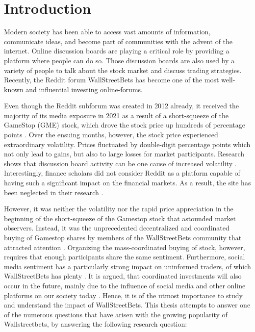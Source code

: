 \documentclass[11pt, a4paper]{article}
\begin{document}
\section{Introduction} \label{introduction}

Modern society has been able to access vast amounts of information, communicate ideas, and become part of communities with the advent of the internet. 
Online discussion boards are playing a critical role by providing a platform where people can do so. Those discussion boards are also used by a 
variety of people to talk about the stock market and discuss trading strategies. Recently, the Reddit forum WallStreetBets has become one of 
the most well-known and influential investing online-forums.

Even though the Reddit subforum was created in 2012 already, it received the majority of its media exposure in 2021 as a result of a short-squeeze 
of the GameStop (GME) stock, which drove the stock price up hundreds of percentage points \citep{diangson2021betonreddit}. Over the ensuing months, however, 
the stock price experienced extraordinary volatility. Prices fluctuated by double-digit percentage points which not only lead to gains, but also to large losses
for market participants. Research shows that discussion board activity can be one cause of increased volatility \citep{das2007yahoo}.
Interestingly, finance scholars did not consider Reddit as a platform capable of having such a significant impact on the financial markets. 
As a result, the site has been neglected in their research \citep{long2021LikeTheStock}.

However, it was neither the volatility nor the rapid price appreciation in the beginning of the short-squeeze of the Gamestop stock that astounded market observers. 
Instead, it was the unprecedented decentralized and coordinated buying of Gamestop shares by members of the WallStreetBets 
community that attracted attention \citep{anand2021WallstreetbetsAgainstWallstreet}.
Organizing the mass-coordinated buying of stock, however, requires that enough participants share the same sentiment. Furthermore, 
social media sentiment has a particularly strong impact on uninformed traders, of which WallStreetBets has plenty \citep{danbolt2015InvestorSentiment}. It is argued, that coordinated investments will also
occur in the future, mainly due to the influence of social media and other online platforms on our society today \citep{semenova2021reddits}. Hence, it is of the utmost importance
to study and understand the impact of WallStreetBets. This thesis attempts to answer one of the numerous questions that have arisen with the 
growing popularity of Wallstreetbets, by answering the following research question:
\end{document}
